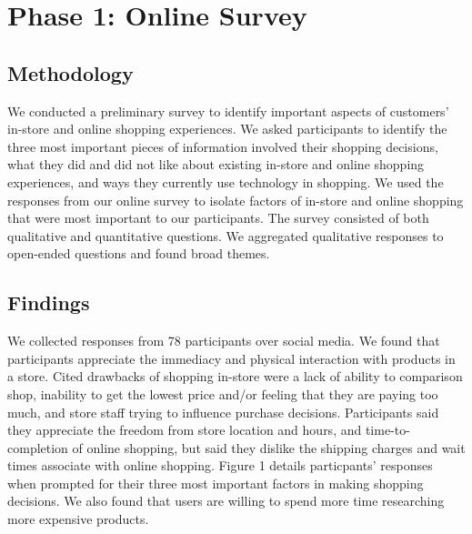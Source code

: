 \section{Phase 1: Online Survey}
\subsection{Methodology}
We conducted a preliminary survey to identify important aspects of customers' in-store and online shopping experiences. We asked participants to identify the three most important pieces of information involved their shopping decisions, what they did and did not like about existing in-store and online shopping experiences, and ways they currently use technology in shopping.   
We used the responses from our online survey to isolate factors of in-store and online shopping that were most important to our participants.  The survey consisted of both qualitative and quantitative questions.  We aggregated qualitative responses to open-ended questions and found broad themes.     


\subsection{Findings}
We collected responses from 78 participants over social media.  We found that participants appreciate the immediacy and physical interaction with products in a store.  Cited drawbacks of shopping in-store were a lack of ability to comparison shop, inability to get the lowest price and/or feeling that they are paying too much, and store staff trying to influence purchase decisions.  Participants said they appreciate the freedom from store location and hours, and time-to-completion of online shopping, but said they dislike the shipping charges and wait times associate with online shopping.  Figure 1  details particpants' responses when prompted for their three most important factors in making shopping decisions.  We also found that users are willing to spend more time researching more expensive products.